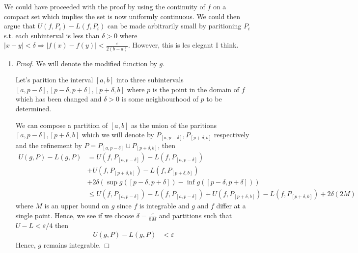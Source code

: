 We could have proceeded with the proof by using the continuity of 
$f$ on a compact set which implies the set is now uniformly continuous. 
We could then argue that $U(f,P_i) - L(f,P_i)$ can be made 
arbitrarily small by paritioning $P_i$ s.t. each subinterval is less than 
$\delta>0$ where $|x-y|<\delta \Rightarrow |f(x)-f(y)|<\frac{\varepsilon}{2(b-a)}$.
However, this is les elegant I think.

\begin{enumerate}[label=(\alph*)]
    \item 
    \begin{proof}
        We will denote the modified function by $g$.

        Let's parition the interval $[a,b]$ into three subintervals 
        $[a,p-\delta], [p-\delta, p+\delta], [p+\delta,b]$ where 
        $p$ is the point in the domain of $f$ which has been changed 
        and $\delta>0$ is some neighbourhood of $p$ to be determined.

        We can compose a partition of $[a,b]$ as the union of the paritions
        $[a,p-\delta], [p+\delta,b]$ which we will denote by $P_{[a,p-\delta]}, 
        P_{[p+\delta,b]}$ respectively and the refinement by $P= P_{[a,p-\delta]} 
        \cup P_{[p+\delta,b]}$, then 
        \begin{align*}
            U(g, P) - L(g, P) &= U(f, P_{[a,p-\delta]}) - L(f, P_{[a,p-\delta]}) \\ 
            &+ U(f, P_{[p+\delta,b]}) - L(f, P_{[p+\delta,b]}) \\
            &+ 2\delta(\sup g([p-\delta, p+\delta]) - \inf g([p-\delta, p+\delta]) ) \\
            &\leq U(f, P_{[a,p-\delta]}) - L(f, P_{[a,p-\delta]}) 
            + U(f, P_{[p+\delta,b]}) - L(f, P_{[p+\delta,b]}) 
            + 2\delta (2M)
        \end{align*}
        where $M$  is an upper bound on $g$ since $f$ is integrable and $g$ and $f$
        differ at a single point.
        Hence, we see if we choose $\delta = \frac{\varepsilon}{8M}$ and 
        partitions such that $U - L < \varepsilon/4$ then 
        \begin{align*}
            U(g, P) - L(g, P) &< \varepsilon
        \end{align*}
        Hence, $g$ remains integrable.


\end{proof}
\end{enumerate}
